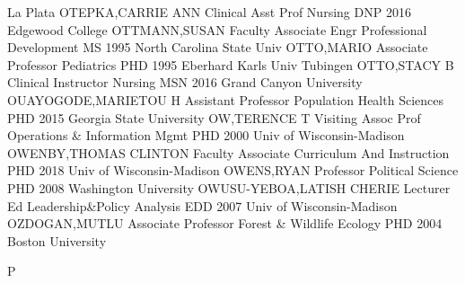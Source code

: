 \documentclass[
]{article}
\begin{document}
La Plata \textbar OTEPKA,CARRIE ANN \textbar{} 
\textbar Clinical Asst Prof \textbar Nursing \textbar DNP 2016 Edgewood
College \textbar OTTMANN,SUSAN \textbar{}  \textbar Faculty
Associate \textbar Engr Professional Development \textbar MS 1995 North
Carolina State Univ \textbar OTTO,MARIO \textbar{} 
\textbar Associate Professor \textbar Pediatrics \textbar PHD 1995
Eberhard Karls Univ Tubingen \textbar OTTO,STACY B \textbar{}
 \textbar Clinical Instructor \textbar Nursing \textbar MSN
2016 Grand Canyon University \textbar OUAYOGODE,MARIETOU H \textbar{}
 \textbar Assistant Professor \textbar Population Health
Sciences \textbar PHD 2015 Georgia State University \textbar OW,TERENCE
T \textbar{}  \textbar Visiting Assoc Prof
\textbar Operations \& Information Mgmt \textbar PHD 2000 Univ of
Wisconsin-Madison \textbar OWENBY,THOMAS CLINTON \textbar{} 
\textbar Faculty Associate \textbar Curriculum And Instruction
\textbar PHD 2018 Univ of Wisconsin-Madison \textbar OWENS,RYAN
\textbar{}  \textbar Professor \textbar Political Science
\textbar PHD 2008 Washington University \textbar OWUSU-YEBOA,LATISH
CHERIE \textbar{}  \textbar Lecturer \textbar Ed
Leadership\&Policy Analysis \textbar EDD 2007 Univ of Wisconsin-Madison
\textbar OZDOGAN,MUTLU \textbar{}  \textbar Associate
Professor \textbar Forest \& Wildlife Ecology \textbar PHD 2004 Boston
University \textbar{}

P

\textbar{}  \textbar{}
\end{document}
